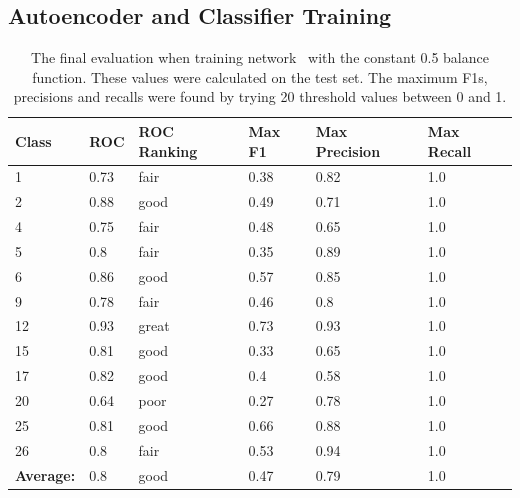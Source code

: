       \subsection{Autoencoder and Classifier Training}

        \begin{table}[!h]
        \centering
        {\footnotesize
        \begin{tabular}{llllll}
        \hline
        \textbf{Class}    & \textbf{ROC} & \textbf{ROC Ranking} & \textbf{Max F1} & \textbf{Max Precision} & \textbf{Max Recall} \\ \hline
        1                 & 0.73 	&fair 	&0.38 	&0.82 &	1.0      \\
        2                 & 0.88 	&good 	&0.49 	&0.71 &	1.0      \\
        4                 & 0.75 	&fair 	&0.48 	&0.65 &	1.0      \\
        5                 & 0.8 	&fair 	&0.35 	&0.89 &	1.0      \\
        6                 & 0.86 	&good 	&0.57 	&0.85 &	1.0      \\
        9                 & 0.78  &	fair  &	0.46  &	0.8 &	1.0      \\
        12                & 0.93 	&great  &0.73 	&0.93 &	1.0      \\
        15                & 0.81 	&good 	&0.33 	&0.65 &	1.0      \\
        17                & 0.82  &good   &0.4 	  &0.58 &	1.0      \\
        20                & 0.64 	&poor 	&0.27 	&0.78 &	1.0      \\
        25                & 0.81 	&good 	&0.66 	&0.88 &	1.0      \\
        26                & 0.8 	&fair 	&0.53 	&0.94 &	1.0      \\ \hline
        \textbf{Average:} & 0.8 	&good 	&0.47 	&0.79 &	1.0      \\ \hline
        \end{tabular} }
        \caption{The final evaluation when training network \networkII\ with the constant 0.5 balance function.
        These values were
        calculated on the test set. The maximum F1s, precisions and recalls
        were found by trying 20 threshold values between 0 and 1.}
        \label{tab:biglisiiit}
        \end{table}


